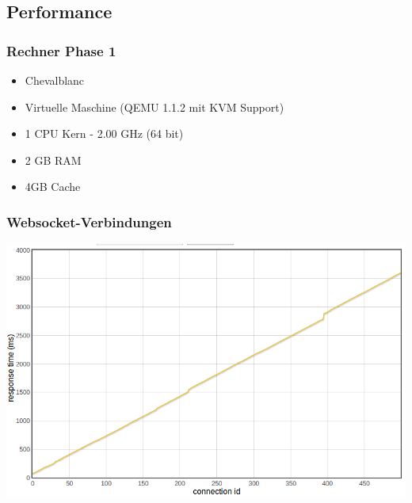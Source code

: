 \subsection{Performance}

\begin{frame}
\frametitle{Rechner Phase 1}
\begin{itemize}
	\item Chevalblanc
	\item Virtuelle Maschine (QEMU 1.1.2 mit KVM Support)
	\item 1 CPU Kern - 2.00 GHz (64 bit)
	\item 2 GB RAM
	\item 4GB Cache
	
\end{itemize}
\end{frame}

\begin{frame}
\frametitle{Websocket-Verbindungen}
	\begin{center}
		\includegraphics[scale=0.3]{performance/connection-response.png}
	
	\end{center}
\end{frame}
